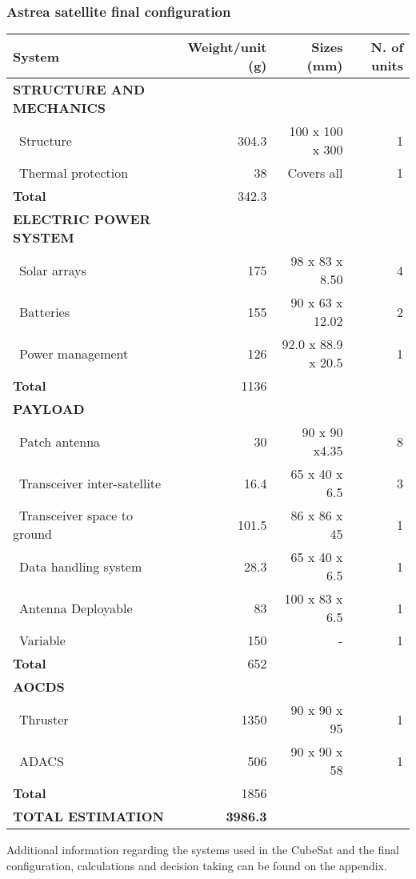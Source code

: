 \subsubsection{Astrea satellite final configuration}
\begin{longtable}{| l | r | r | r |}
	\hline
	\rowcolor[gray]{0.80}	\textbf{System}& \textbf{Weight/unit (g)} & \textbf{Sizes (mm)} & \textbf{N. of units}\\
	\hline
	\hline
	\endfirsthead
	
	
	\rowcolor[gray]{0.85} \textbf{STRUCTURE AND MECHANICS} & & & \\ \hline
	
	~Structure & 304.3 & 100 x 100 x 300& 1 \\
	~Thermal protection & 38 & Covers all & 1\\
	\hline 
	\rowcolor[gray]{0.95} \textbf{Total} & 342.3 & &  \\
	\hline 
	
	\rowcolor[gray]{0.85} \textbf{ELECTRIC POWER SYSTEM} & & & \\\hline
	
	~Solar arrays & 175 & 98 x 83 x 8.50 & 4 \\
	~Batteries & 155 & 90 x 63 x 12.02 & 2 \\
	~Power management & 126 & 92.0 x 88.9 x 20.5 & 1 \\
	\hline
	\rowcolor[gray]{0.95} \textbf{Total} & 1136 &  &  \\
	\hline \hline
	
	\rowcolor[gray]{0.85} \textbf{PAYLOAD} & & & \\ \hline
	
	~Patch antenna & 30 & 90 x 90 x4.35& 8 \\
	~Transceiver inter-satellite & 16.4 & 65 x 40 x 6.5 & 3 \\
	~Transceiver space to ground & 101.5 & 86 x 86 x 45 & 1 \\
	~Data handling system & 28.3 & 65 x 40 x 6.5 & 1\\
	~Antenna Deployable & 83 & 100 x 83 x 6.5 &1\\
	~Variable & 150 & - & 1\\
	\hline
	\rowcolor[gray]{0.95} \textbf{Total} & 652 &  & \\
	\hline \hline
	
	\rowcolor[gray]{0.85} \textbf{AOCDS} & & &\\ \hline
	
	~Thruster & 1350 & 90 x 90 x 95 & 1 \\
	~ADACS & 506 & 90 x 90 x 58 & 1 \\
	\hline
	\rowcolor[gray]{0.95} \textbf{Total} & 1856 &  & \\
	\hline
	
	\rowcolor[gray]{0.9} \textbf{TOTAL ESTIMATION} & \textbf{3986.3} & & \\ \hline
\end{longtable} 

Additional information regarding the systems used in the CubeSat and the final configuration, calculations and decision taking can be found on the appendix.